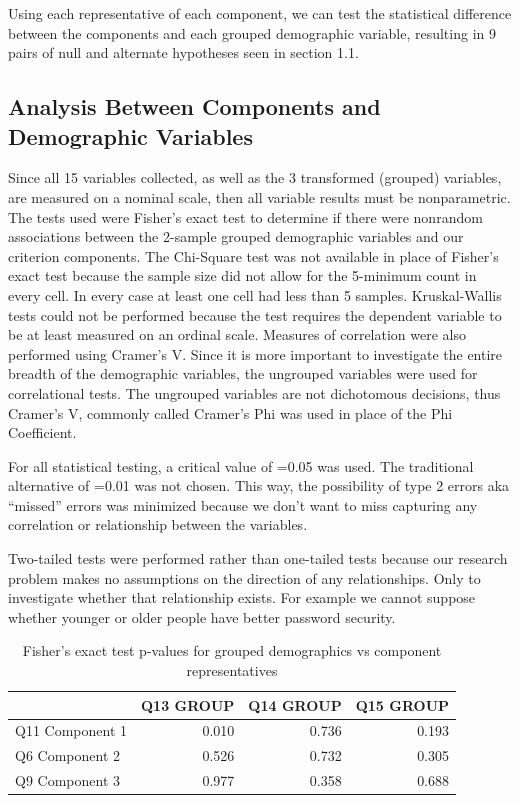 \documentclass[letterpaper, 10 pt, conference]{ieeeconf}  %
\begin{document}
Using each representative of each component, we can test the statistical difference between the components and each grouped demographic variable, resulting in 9 pairs of null and alternate hypotheses seen in section 1.1.

\subsection{Analysis Between Components and Demographic Variables}

Since all 15 variables collected, as well as the 3 transformed (grouped) variables, are measured on a nominal scale, then all variable results must be nonparametric. The tests used were Fisher’s exact test to determine if there were nonrandom associations between the 2-sample grouped demographic variables and our criterion components. The Chi-Square test was not available in place of Fisher’s exact test because the sample size did not allow for the 5-minimum count in every cell. In every case at least one cell had less than 5 samples. Kruskal-Wallis tests could not be performed because the test requires the dependent variable to be at least measured on an ordinal scale. Measures of correlation were also performed using Cramer’s V. Since it is more important to investigate the entire breadth of the demographic variables, the ungrouped variables were used for correlational tests. The ungrouped variables are not dichotomous decisions, thus Cramer’s V, commonly called Cramer’s Phi was used in place of the Phi Coefficient. 

For all statistical testing, a critical value of \textalpha{}=0.05 was used. The traditional alternative of \textalpha{}=0.01 was not chosen. This way, the possibility of type 2 errors aka “missed” errors was minimized because we don’t want to miss capturing any correlation or relationship between the variables. 

Two-tailed tests were performed rather than one-tailed tests because our research problem makes no assumptions on the direction of any relationships. Only to investigate whether that relationship exists. For example we cannot suppose whether younger or older people have better password security.

\begin{table}[h]
\caption{Fisher's exact test p-values for grouped demographics vs component representatives}
\label{tab:fisher}
\begin{center}
\begin{tabular}{lrrr}
\hline
                & Q13 GROUP & Q14 GROUP & Q15 GROUP \\ \hline
Q11 Component 1 & 0.010       & 0.736       & 0.193       \\ \hline
Q6 Component 2  & 0.526       & 0.732       & 0.305       \\ \hline
Q9 Component 3  & 0.977       & 0.358       & 0.688       \\ \hline
\end{tabular}
\end{center}
\end{table}
\end{document}

